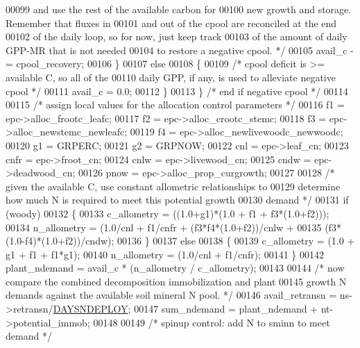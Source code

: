 \begin{DoxyCode}
00099 \textcolor{comment}{            and use the rest of the available carbon for }
00100 \textcolor{comment}{            new growth and storage. Remember that fluxes in}
00101 \textcolor{comment}{            and out of the cpool are reconciled at the end}
00102 \textcolor{comment}{            of the daily loop, so for now, just keep track}
00103 \textcolor{comment}{            of the amount of daily GPP-MR that is not needed}
00104 \textcolor{comment}{            to restore a negative cpool. */}
00105             avail\_c -= cpool\_recovery; 
00106         \}
00107         \textcolor{keywordflow}{else}
00108         \{
00109             \textcolor{comment}{/* cpool deficit is >= available C, so all of the}
00110 \textcolor{comment}{            daily GPP, if any, is used to alleviate negative cpool */}
00111             avail\_c = 0.0;
00112         \}
00113     \} \textcolor{comment}{/* end if negative cpool */}
00114     
00115     \textcolor{comment}{/* assign local values for the allocation control parameters */}
00116     f1 = epc->alloc\_frootc\_leafc;
00117     f2 = epc->alloc\_crootc\_stemc;
00118     f3 = epc->alloc\_newstemc\_newleafc;
00119     f4 = epc->alloc\_newlivewoodc\_newwoodc;
00120     g1 = GRPERC;
00121     g2 = GRPNOW;
00122     cnl = epc->leaf\_cn;
00123     cnfr = epc->froot\_cn;
00124     cnlw = epc->livewood\_cn;
00125     cndw = epc->deadwood\_cn;
00126     pnow = epc->alloc\_prop\_curgrowth;
00127     
00128     \textcolor{comment}{/* given the available C, use constant allometric relationships to}
00129 \textcolor{comment}{    determine how much N is required to meet this potential growth}
00130 \textcolor{comment}{    demand */}
00131     \textcolor{keywordflow}{if} (woody)
00132     \{
00133         c\_allometry = ((1.0+g1)*(1.0 + f1 + f3*(1.0+f2)));
00134         n\_allometry = (1.0/cnl + f1/cnfr + (f3*f4*(1.0+f2))/cnlw + 
00135             (f3*(1.0-f4)*(1.0+f2))/cndw);
00136     \}
00137     \textcolor{keywordflow}{else}
00138     \{
00139         c\_allometry = (1.0 + g1 + f1 + f1*g1);
00140         n\_allometry = (1.0/cnl + f1/cnfr);
00141     \}
00142     plant\_ndemand = avail\_c * (n\_allometry / c\_allometry);
00143     
00144     \textcolor{comment}{/* now compare the combined decomposition immobilization and plant}
00145 \textcolor{comment}{    growth N demands against the available soil mineral N pool. */}
00146     avail\_retransn = ns->retransn/\hyperlink{daily__allocation_8c_aea9c7b118244ce7b3ee8a566854ad3d8}{DAYSNDEPLOY};
00147     sum\_ndemand = plant\_ndemand + nt->potential\_immob;
00148 
00149     \textcolor{comment}{/* spinup control: add N to sminn to meet demand */}

\end{DoxyCode}
